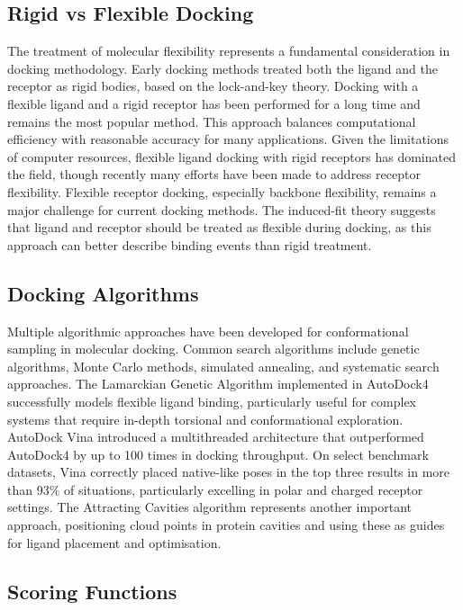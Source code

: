 \documentclass[12pt]{article}
\begin{document}
\subsection{Rigid vs Flexible Docking}

The treatment of molecular flexibility represents a fundamental consideration in docking methodology. Early docking methods treated both the ligand and the receptor as rigid bodies, based on the lock-and-key theory. Docking with a flexible ligand and a rigid receptor has been performed for a long time and remains the most popular method. This approach balances computational efficiency with reasonable accuracy for many applications. Given the limitations of computer resources, flexible ligand docking with rigid receptors has dominated the field, though recently many efforts have been made to address receptor flexibility. Flexible receptor docking, especially backbone flexibility, remains a major challenge for current docking methods. The induced-fit theory suggests that ligand and receptor should be treated as flexible during docking, as this approach can better describe binding events than rigid treatment\cite{CH1_18}.



\subsection{Docking Algorithms}

Multiple algorithmic approaches have been developed for conformational sampling in molecular docking. Common search algorithms include genetic algorithms, Monte Carlo methods, simulated annealing, and systematic search approaches. The Lamarckian Genetic Algorithm implemented in AutoDock4\cite{CH1_9} successfully models flexible ligand binding, particularly useful for complex systems that require in-depth torsional and conformational exploration. AutoDock Vina\cite{CH1_19} introduced a multithreaded architecture that outperformed AutoDock4 by up to 100 times in docking throughput. On select benchmark datasets, Vina correctly placed native-like poses in the top three results in more than 93\% of situations, particularly excelling in polar and charged receptor settings. The Attracting Cavities algorithm represents another important approach, positioning cloud points in protein cavities and using these as guides for ligand placement and optimisation.





\subsection{Scoring Functions}
\end{document}
